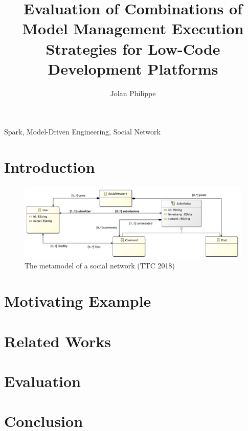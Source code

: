 \documentclass[a4paper,en]{jdoc}
\title{Evaluation of Combinations of Model Management Execution Strategies for Low-Code Development Platforms}
\author{Jolan Philippe}
\begin{document}
\makehead

\begin{abstract} 

\end{abstract}

\begin{keywords} Spark, Model-Driven Engineering, Social Network \end{keywords}

\section{Introduction}
\label{sec:introduction}


\newpage
\begin{figure}[h]
    \centering
    \includegraphics[scale=0.23]{figures/ttc18uml_large.png}
    \caption{The metamodel of a social network (TTC 2018)}
    \label{fig:ttc_mm}
\end{figure}   


\section{Motivating Example}
\label{sec:example}



\section{Related Works}
\label{sec:related}


% 

\section{Evaluation}
\label{sec:evaluation}


\section{Conclusion}
\label{sec:conclusion}




\end{document}
